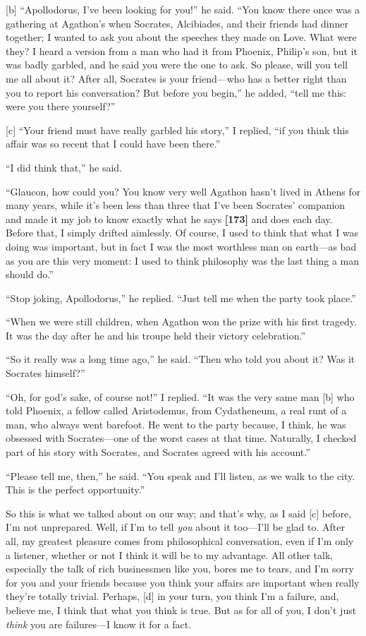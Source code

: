{[}b{]} “Apollodorus, I've been looking for you!” he said. “You know
there once was a gathering at Agathon's when Socrates, Alcibiades, and
their friends had dinner together; I wanted to ask you about the
speeches they made on Love. What were they? I heard a version from a man
who had it from Phoenix, Philip's son, but it was badly garbled, and he
said you were the one to ask. So please, will you tell me all about it?
After all, Socrates is your friend---who has a better right than you to
report his conversation? But before you begin,” he added, “tell me this:
were you there yourself?”

{[}c{]} “Your friend must have really garbled his story,” I replied, “if
you think this affair was so recent that I could have been there.”

“I did think that,” he said.

“Glaucon, how could you? You know very well Agathon hasn't lived in
Athens for many years, while it's been less than three that I've been
Socrates' companion and made it my job to know exactly what he says
{\bf {[}173{]}} and does each day. Before that, I simply drifted
aimlessly. Of course, I used to think that what I was doing was
important, but in fact I was the most worthless man on earth---as bad as
you are this very moment: I used to think philosophy was the last thing
a man should do.”

“Stop joking, Apollodorus,” he replied. “Just tell me when the party
took place.”

“When we were still children, when Agathon won the prize with his first
tragedy. It was the day after he and his troupe held their victory
celebration.”

“So it really was a long time ago,” he said. “Then who told you about
it? Was it Socrates himself?”

“Oh, for god's sake, of course not!” I replied. “It was the very same
man {[}b{]} who told Phoenix, a fellow called Aristodemus, from
Cydatheneum, a real runt of a man, who always went barefoot. He went to
the party because, I think, he was obsessed with Socrates---one of the
worst cases at that time. Naturally, I checked part of his story with
Socrates, and Socrates agreed with his account.”

“Please tell me, then,” he said. “You speak and I'll listen, as we walk
to the city. This is the perfect opportunity.”

So this is what we talked about on our way; and that's why, as I said
{[}c{]} before, I'm not unprepared. Well, if I'm to tell {\em you} about
it too---I'll be glad to. After all, my greatest pleasure comes from
philosophical conversation, even if I'm only a listener, whether or not
I think it will be to my advantage. All other talk, especially the talk
of rich businessmen like you, bores me to tears, and I'm sorry for you
and your friends because you think your affairs are important when
really they're totally trivial. Perhaps, {[}d{]} in your turn, you think
I'm a failure, and, believe me, I think that what you think is true. But
as for all of you, I don't just {\em think} you are failures---I know it
for a fact.

